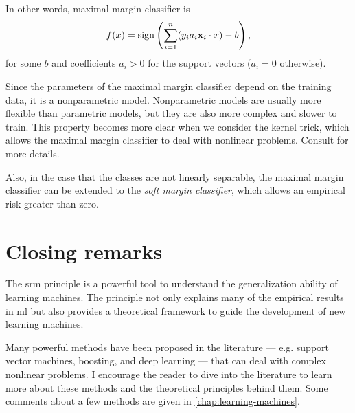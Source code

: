 In other words, maximal margin classifier is
\[
  f(x) = \operatorname{sign}\left(\sum_{i=1}^{n} (y_i a_i \mathbf{x}_i \cdot x) - b\right)\text{,}
\]
for some $b$ and coefficients $a_i > 0$ for the support vectors ($a_i = 0$ otherwise).

Since the parameters of the maximal margin classifier depend on the training data,
it is a nonparametric model.  Nonparametric models are usually more flexible than
parametric models, but they are also more complex and slower to train.
This property becomes more clear when we consider the kernel trick, which allows
the maximal margin classifier to deal with nonlinear problems.  Consult
\citeauthor{Vapnik1999b} for more details.

Also, in the case that the classes are not linearly separable, the maximal margin
classifier can be extended to the \emph{soft margin classifier}, which allows an empirical
risk greater than zero.

\section{Closing remarks}

The \gls{srm} principle is a powerful tool to understand the generalization ability of
learning machines.  The principle not only explains many of the empirical results in
\gls{ml} but also provides a theoretical framework to guide the development of new
learning machines.

Many powerful methods have been proposed in the literature --- e.g. support vector
machines, boosting, and deep learning --- that can deal with complex nonlinear problems.
I encourage the reader to dive into the literature to learn more about these methods and
the theoretical principles behind them.  Some comments about a few methods are given in
\cref{chap:learning-machines}.

